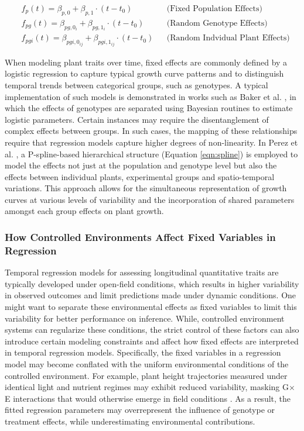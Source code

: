 \documentclass{article}
\begin{document}
{\noindent \begin{align}\label{eqn:fixedpop}
    &f_p(t) = \beta_{p,0} + \beta_{p,1} \cdot (t - t_0) && \text{(Fixed Population Effects)}\\ \label{eqn:randgen}
    &f_{pg}(t) = \beta_{pg,0_{i}} + \beta_{pg,1_{i}} \cdot (t - t_0)&& \text{(Random Genotype Effects)} \\ \label{eqn:randindv}
    &f_{pgi}(t) = \beta_{pgi,0_{ij}} + \beta_{pgi,1_{ij}} \cdot (t - t_0) && \text{(Random Indvidual Plant Effects)}
\end{align}}

When modeling plant traits over time, fixed effects are commonly defined by a logistic regression to capture typical growth curve patterns and to distinguish temporal trends between categorical groups, such as genotypes. A typical implementation of such models is demonstrated in works such as Baker et al. \cite {Baker2018Baysian}, in which the effects of genotypes are separated using Bayesian routines to estimate logistic parameters. Certain instances may require the disentanglement of complex effects between groups. In such cases, the mapping of these relationships require that regression models capture higher degrees of non-linearity. In Perez et al. \cite{perez2024one}, a P-spline-based hierarchical structure (Equation \ref{eqn:spline}) is employed to model the effects not just at the population and genotype level but also the effects between individual plants, experimental groups and spatio-temporal variations. This approach allows for the simultaneous representation of growth curves at various levels of variability and the incorporation of shared parameters amongst each group effects on plant growth. 

\subsubsection{How Controlled Environments Affect Fixed Variables in Regression}
Temporal regression models for assessing longitudinal quantitative traits are typically developed under open-field conditions, which results in higher variability in observed outcomes and limit predictions made under dynamic conditions. 
One might want to separate these environmental effects as fixed variables to limit this variability for better performance on inference. 
While, controlled environment systems can regularize these conditions, the strict control of these factors can also introduce certain modeling constraints and affect how fixed effects are interpreted in temporal regression models.
Specifically, the fixed variables in a regression model may become conflated with the uniform environmental conditions of the controlled environment. 
For example, plant height trajectories measured under identical light and nutrient regimes may exhibit reduced variability, 
masking G$\times$E interactions that would otherwise emerge in field conditions \cite{teressa2021multi}. 
As a result, the fitted regression parameters may overrepresent the influence of genotype or treatment effects, while underestimating environmental contributions.
\end{document}
